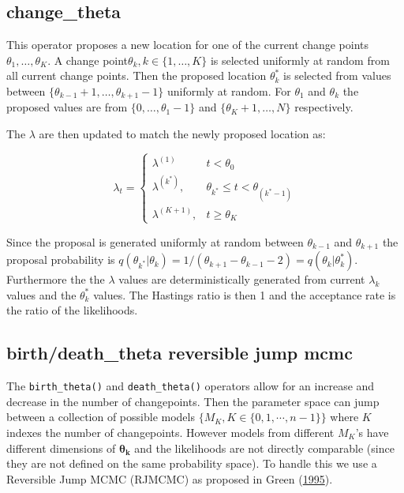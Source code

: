 \documentclass[]{article}
\numberwithin{equation}{section}
\begin{document}
\hypertarget{change_theta}{%
\subsection{change\_theta}\label{change_theta}}

This operator proposes a new location for one of the current change
points \(\theta_1,\dots, \theta_K\). A change
point\(\theta_k, k \in \{1, \dots, K\}\) is selected uniformly at random
from all current change points. Then the proposed location
\(\theta_k^*\) is selected from values between
\(\{\theta_{k-1}+1,\dots, \theta_{k+1}-1\}\) uniformly at random. For
\(\theta_1\) and \(\theta_k\) the proposed values are from
\(\{0,\dots, \theta_1-1\}\) and \(\{\theta_K+1,\dots, N\}\)
respectively.

The \(\lambda\) are then updated to match the newly proposed location
as:

\[ \lambda_t =  \begin{cases} \lambda^{(1)} & t < \theta_0 \\
\lambda^{(k^*)}, & \theta_{k^*} \leq t < \theta_{(k^*-1)} \\
\lambda^{(K+1)}, & t \geq \theta_K \end{cases}\]

Since the proposal is generated uniformly at random between
\(\theta_{k-1}\) and \(\theta_{k+1}\) the proposal probability is
\(q(\theta_{k^*}|\theta_k) = 1/(\theta_{k+1}-\theta_{k-1}-2) = q(\theta_k|\theta_k^*)\).
Furthermore the the \(\lambda\) values are deterministically generated
from current \(\lambda_k\) values and the \(\theta_k^*\) values. The
Hastings ratio is then 1 and the acceptance rate is the ratio of the
likelihoods.

\hypertarget{birthdeath_theta-reversible-jump-mcmc}{%
\subsection{birth/death\_theta reversible jump
mcmc}\label{birthdeath_theta-reversible-jump-mcmc}}

The \texttt{birth\_theta()} and \texttt{death\_theta()} operators allow
for an increase and decrease in the number of changepoints. Then the
parameter space can jump between a collection of possible models
\(\{M_K, K \in \{0,1,\cdots,n-1\}\}\) where \(K\) indexes the number of
changepoints. However models from different \(M_K\)'s have different
dimensions of \(\boldsymbol{\theta_k}\) and the likelihoods are not
directly comparable (since they are not defined on the same probability
space). To handle this we use a Reversible Jump MCMC (RJMCMC) as
proposed in Green (\protect\hyperlink{ref-green_reversible_1995}{1995}).
\end{document}
